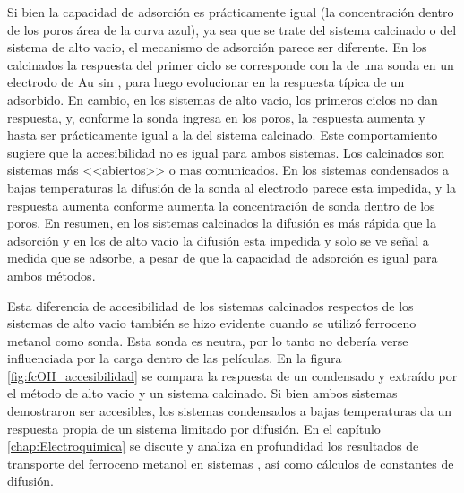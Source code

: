       Si bien la capacidad de adsorción es prácticamente igual (la concentración dentro de los poros área de la curva azul), ya sea que se trate del sistema calcinado o del sistema de alto vacio, el mecanismo de adsorción parece ser diferente. En los calcinados la respuesta del primer ciclo se corresponde con la de una sonda en un electrodo de Au sin \pdm, para luego evolucionar en la respuesta típica de un adsorbido. En cambio, en los sistemas de alto vacio, los primeros ciclos no dan respuesta, y, conforme la sonda ingresa en los poros, la respuesta aumenta y hasta ser prácticamente igual a la del sistema calcinado. Este comportamiento sugiere que la accesibilidad no es igual para ambos sistemas. Los calcinados son sistemas más <<abiertos>> o mas comunicados. En los sistemas condensados a bajas temperaturas la difusión de la sonda al electrodo parece esta impedida, y la respuesta aumenta conforme aumenta la concentración de sonda dentro de los poros. En resumen, en los sistemas calcinados la difusión es más rápida que la adsorción y en los de alto vacio la difusión esta impedida y solo se ve señal a medida que se adsorbe, a pesar de que la capacidad de adsorción es igual para ambos métodos.

      Esta diferencia de accesibilidad de los sistemas calcinados respectos de los sistemas de alto vacio también se hizo evidente cuando se utilizó ferroceno metanol como sonda. Esta sonda es neutra, por lo tanto no debería verse influenciada por la carga dentro de las películas. En la figura \ref{fig:fcOH_accesibilidad} se compara la respuesta de un \pdmF\space condensado y extraído por el método de alto vacio y un sistema \pdmF\space calcinado. Si bien ambos sistemas demostraron ser accesibles, los sistemas condensados a bajas temperaturas da un respuesta propia de un sistema limitado por difusión. En el capítulo \ref{chap:Electroquimica} se discute y analiza en profundidad  los resultados de transporte del ferroceno metanol en sistemas \pdmF, así como cálculos de constantes de difusión.

